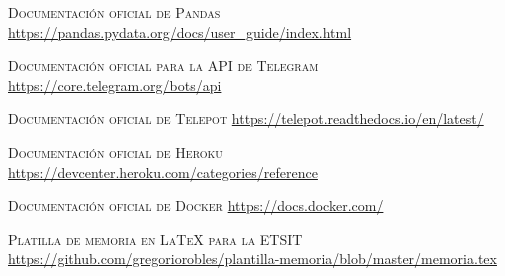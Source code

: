 \documentclass[a4paper, 12pt, oneside]{book}
\begin{document}
\begin{thebibliography}{X}
 \textsc{Documentación oficial de Pandas}
\url{https://pandas.pydata.org/docs/user_guide/index.html}

 \textsc{Documentación oficial para la API de Telegram}
\url{https://core.telegram.org/bots/api}

 \textsc{Documentación oficial de Telepot}
\url{https://telepot.readthedocs.io/en/latest/}
	
 \textsc{Documentación oficial de Heroku}
\url{https://devcenter.heroku.com/categories/reference}
	
 \textsc{Documentación oficial de Docker}
\url{https://docs.docker.com/}

 \textsc{Platilla de memoria en LaTeX para la ETSIT}
\url{https://github.com/gregoriorobles/plantilla-memoria/blob/master/memoria.tex}

\end{thebibliography}
\end{document}
